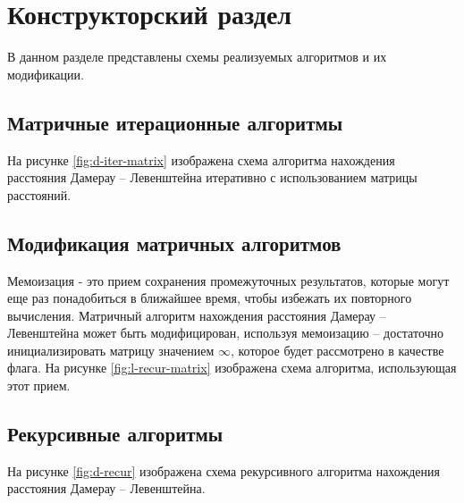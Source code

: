\chapter{Конструкторский раздел}
В данном разделе представлены схемы реализуемых алгоритмов и их модификации.
\section{Матричные итерационные алгоритмы}
На рисунке \ref{fig:d-iter-matrix} изображена схема алгоритма нахождения расстояния Дамерау -- Левенштейна итеративно  с использованием матрицы расстояний.
\section{Модификация матричных алгоритмов}
Мемоизация - это прием сохранения промежуточных результатов, которые могут еще раз понадобиться в ближайшее время, чтобы избежать их повторного вычисления. 
Матричный алгоритм нахождения расстояния Дамерау -- Левенштейна может быть модифицирован, используя мемоизацию -- достаточно инициализировать матрицу значением $\infty$, которое будет рассмотрено в качестве флага.
На рисунке \ref{fig:l-recur-matrix} изображена схема алгоритма, использующая этот прием.
\section{Рекурсивные алгоритмы}
На рисунке \ref{fig:d-recur} изображена схема рекурсивного алгоритма  нахождения расстояния Дамерау -- Левенштейна.
\newpage 


